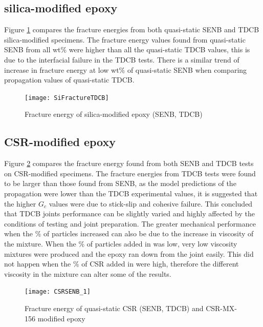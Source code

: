 \documentclass[numbers=noendperiod,chapterprefix=on]{icldt} %
\begin{document}
\subsection{silica-modified epoxy}
Figure \ref{SiFractureTDCB} compares the fracture energies from both quasi-static SENB and TDCB silica-modified specimens. The fracture energy values found from quasi-static SENB from all wt\% were higher than all the quasi-static TDCB values, this is due to the interfacial failure in the TDCB tests.
There is a similar trend of increase in fracture energy at low wt\% of quasi-static SENB when comparing propagation values of quasi-static TDCB. 

\begin{figure}[!htpb]
\centering
\texttt{[image: SiFractureTDCB]}
\caption{Fracture energy of silica-modified epoxy (SENB, TDCB)} \label{SiFractureTDCB}
\end{figure}
\FloatBarrier

\subsection{CSR-modified epoxy}
Figure \ref{CSRSENB} compares the fracture energy found from both SENB and TDCB tests on CSR-modified specimens. The fracture energies from TDCB tests were found to be larger than those found from SENB, as the model predictions of the propagation were lower than the TDCB experimental values, it is suggested that the 
higher $ G_{c} $ values were due to stick-slip and cohesive failure. This concluded that TDCB joints performance can be slightly varied and highly affected by the conditions of testing and joint preparation. The greater mechanical performance when the \% of particles increased can also be due to the increase in viscosity of the mixture. When the \% of particles added in was low, very low viscosity mixtures were produced and the epoxy ran down from the joint easily. This did not happen when the \% of CSR added in were high, therefore the different viscosity in the mixture can alter some of the results.

\begin{figure}[!htpb]
\centering
\texttt{[image: CSRSENB\_1]}
\caption{Fracture energy of quasi-static CSR (SENB, TDCB) and CSR-MX-156 modified epoxy \cite{Giannakopoulos2011}}  \label{CSRSENB}
\end{figure}
\FloatBarrier
\end{document}
